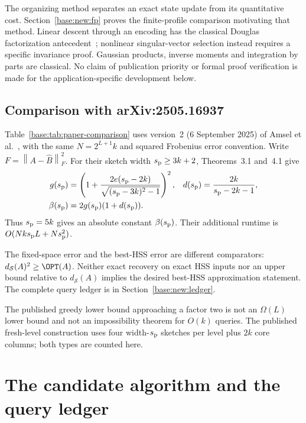 \documentclass[11pt,oneside,openany,a4paper]{book}
\numberwithin{equation}{chapter}
\theoremstyle{definition}
\theoremstyle{remark}
\newcommand{\F}[1]{\left\lVert#1\right\rVert_F}
\begin{document}
The organizing method separates an exact state update from its quantitative cost.
Section~\ref{base:new:fp} proves the finite-profile comparison motivating that method.
Linear descent through an encoding has the classical Douglas factorization
antecedent~\cite{Douglas}; nonlinear singular-vector selection instead requires
a specific invariance proof. Gaussian products, inverse moments and integration
by parts are classical. No claim of publication priority or formal proof verification
is made for the application-specific development below.

\subsection{Comparison with arXiv:2505.16937}\label{base:subsec:paper-comparison}
Table~\ref{base:tab:paper-comparison} uses version~2 (6 September 2025) of
Amsel et al.~\cite{AmselHSS}, with the same $N=2^{L+1}k$ and squared
Frobenius error convention. Write $F=\F{A-\widehat B}^2$. For their sketch
width $s_{\rm p}\ge3k+2$, Theorems~3.1 and~4.1 give
\begin{align}
 g(s_{\rm p})&=\left(1+
 \frac{2e(s_{\rm p}-2k)}{\sqrt{(s_{\rm p}-3k)^2-1}}\right)^2,
 & d(s_{\rm p})&=\frac{2k}{s_{\rm p}-2k-1},\nonumber\\
 \beta(s_{\rm p})&=2g(s_{\rm p})(1+d(s_{\rm p})).
 \label{base:eq:paper-beta}
\end{align}
Thus $s_{\rm p}=5k$ gives an absolute constant $\beta(s_{\rm p})$.
Their additional runtime is $O(Nks_{\rm p}L+Ns_{\rm p}^2)$.

The fixed-space error and the best-HSS error are different comparators:
$d_{\mathcal S}(A)^2\ge\OPT(A)$. Neither exact recovery on exact HSS inputs nor
an upper bound relative to $d_{\mathcal S}(A)$ implies the desired best-HSS
approximation statement. The complete query ledger is in
Section~\ref{base:new:ledger}.

The published greedy lower bound approaching a factor two is not an
$\Omega(L)$ lower bound and not an impossibility theorem for $O(k)$ queries.
The published fresh-level construction uses four width-$s_{\rm p}$ sketches
per level plus $2k$ core columns; both types are counted here.

\section{The candidate algorithm and the query ledger}\label{base:sec:algorithm}
\end{document}
